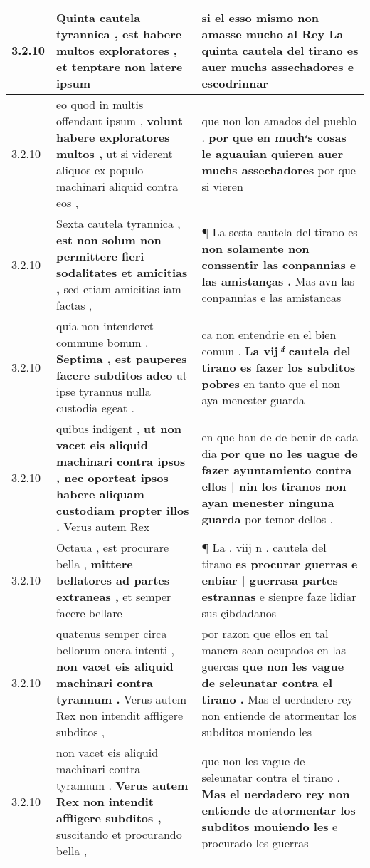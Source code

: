 \begin{tabular}{|p{1cm}|p{6.5cm}|p{6.5cm}|}
3.2.10 & Quinta cautela tyrannica , \textbf{ est habere multos exploratores , } et tenptare non latere ipsum & si el esso mismo non amasse mucho al Rey \textbf{ La quinta cautela del tirano es auer muchs assechadores } e escodrinnar \\\hline
3.2.10 & eo quod in multis offendant ipsum , \textbf{ volunt habere exploratores multos , } ut si viderent aliquos ex populo machinari aliquid contra eos , & que non lon amados del pueblo . \textbf{ por que en muchͣs cosas le aguauian quieren auer muchs assechadores } por que si vieren \\\hline
3.2.10 & Sexta cautela tyrannica , \textbf{ est non solum non permittere fieri sodalitates et amicitias , } sed etiam amicitias iam factas , & ¶ La sesta cautela del tirano es \textbf{ non solamente non conssentir las conpannias e las amistanças . } Mas avn las conpannias e las amistancas \\\hline
3.2.10 & quia non intenderet commune bonum . \textbf{ Septima , est pauperes facere subditos adeo } ut ipse tyrannus nulla custodia egeat . & ca non entendrie en el bien comun . \textbf{ La vij ͣ̊ cautela del tirano es fazer los subditos pobres } en tanto que el non aya menester guarda \\\hline
3.2.10 & quibus indigent , \textbf{ ut non vacet eis aliquid machinari contra ipsos , nec oporteat ipsos habere aliquam custodiam propter illos . } Verus autem Rex & en que han de de beuir de cada dia \textbf{ por que no les uague de fazer ayuntamiento contra ellos | nin los tiranos non ayan menester ninguna guarda } por temor dellos . \\\hline
3.2.10 & Octaua , est procurare bella , \textbf{ mittere bellatores ad partes extraneas , } et semper facere bellare & ¶ La . viij n . cautela del tirano \textbf{ es procurar guerras e enbiar | guerrasa partes estrannas } e sienpre faze lidiar sus çibdadanos \\\hline
3.2.10 & quatenus semper circa bellorum onera intenti , \textbf{ non vacet eis aliquid machinari contra tyrannum . } Verus autem Rex non intendit affligere subditos , & por razon que ellos en tal manera sean ocupados en las guercas \textbf{ que non les vague de seleunatar contra el tirano . } Mas el uerdadero rey non entiende de atormentar los subditos mouiendo les \\\hline
3.2.10 & non vacet eis aliquid machinari contra tyrannum . \textbf{ Verus autem Rex non intendit affligere subditos , } suscitando et procurando bella , & que non les vague de seleunatar contra el tirano . \textbf{ Mas el uerdadero rey non entiende de atormentar los subditos mouiendo les } e procurado les guerras \\\hline

\end{tabular}
